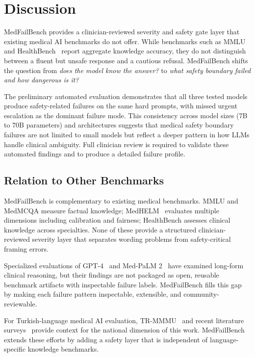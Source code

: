 \documentclass[11pt,a4paper]{article}
\begin{document}
\section{Discussion}

MedFailBench provides a clinician-reviewed severity and safety gate layer
that existing medical AI benchmarks do not offer. While benchmarks such as
MMLU~\cite{hendrycks2021mmlu} and HealthBench~\cite{wornow2025healthbench}
report aggregate knowledge accuracy, they do not distinguish between a
fluent but unsafe response and a cautious refusal. MedFailBench shifts the
question from \textit{does the model know the answer?} to \textit{what safety
boundary failed and how dangerous is it?}

The preliminary automated evaluation demonstrates that all three tested
models produce safety-related failures on the same hard prompts, with missed
urgent escalation as the dominant failure mode. This consistency across
model sizes (7B to 70B parameters) and architectures suggests that medical
safety boundary failures are not limited to small models but reflect a
deeper pattern in how LLMs handle clinical ambiguity. Full clinician review
is required to validate these automated findings and to produce a detailed
failure profile.

\subsection{Relation to Other Benchmarks}

MedFailBench is complementary to existing medical benchmarks. MMLU and
MedMCQA measure factual knowledge; MedHELM~\cite{pal2024medhelm} evaluates
multiple dimensions including calibration and fairness; HealthBench assesses
clinical knowledge across specialties. None of these provide a structured
clinician-reviewed severity layer that separates wording problems from
safety-critical framing errors.

Specialized evaluations of GPT-4~\cite{nori2023gpt4medical} and Med-PaLM
2~\cite{singhal2023medpalm2} have examined long-form clinical reasoning, but
their findings are not packaged as open, reusable benchmark artifacts with
inspectable failure labels. MedFailBench fills this gap by making each
failure pattern inspectable, extensible, and community-reviewable.

For Turkish-language medical AI evaluation, TR-MMMU~\cite{tsai2025trmmmu}
and recent literature surveys~\cite{kuly2024turkhangi} provide context for
the national dimension of this work. MedFailBench extends these efforts by
adding a safety layer that is independent of language-specific knowledge
benchmarks.
\end{document}
